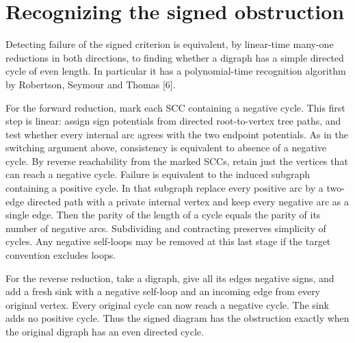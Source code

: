 \documentclass[11pt]{article}
\begin{document}
\section{Recognizing the signed obstruction}
Detecting failure of the signed criterion is equivalent, by linear-time many-one reductions in both directions, to finding whether a digraph has a simple directed cycle of even length. In particular it has a polynomial-time recognition algorithm by Robertson, Seymour and Thomas [6].

For the forward reduction, mark each SCC containing a negative cycle. This first step is linear: assign sign potentials from directed root-to-vertex tree paths, and test whether every internal arc agrees with the two endpoint potentials. As in the switching argument above, consistency is equivalent to absence of a negative cycle. By reverse reachability from the marked SCCs, retain just the vertices that can reach a negative cycle. Failure is equivalent to the induced subgraph containing a positive cycle. In that subgraph replace every positive arc by a two-edge directed path with a private internal vertex and keep every negative arc as a single edge. Then the parity of the length of a cycle equals the parity of its number of negative arcs. Subdividing and contracting preserves simplicity of cycles. Any negative self-loops may be removed at this last stage if the target convention excludes loops.

For the reverse reduction, take a digraph, give all its edges negative signs, and add a fresh sink with a negative self-loop and an incoming edge from every original vertex. Every original cycle can now reach a negative cycle. The sink adds no positive cycle. Thus the signed diagram has the obstruction exactly when the original digraph has an even directed cycle.
\end{document}
